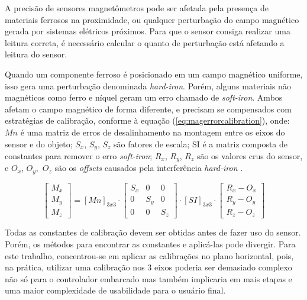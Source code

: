 A precisão de sensores magnetômetros pode ser afetada pela presença de materiais ferrosos na proximidade, ou qualquer perturbação do campo magnético gerada por sistemas elétricos próximos. Para que o sensor consiga realizar uma leitura correta, é necessário calcular o quanto de perturbação está afetando a leitura do sensor.

Quando um componente ferroso é posicionado em um campo magnético uniforme, isso gera uma perturbação denominada \textit{hard-iron}. Porém, alguns materiais não magnéticos como ferro e níquel geram um erro chamado de \textit{soft-iron}. Ambos afetam o campo magnético de forma diferente, e precisam se compensados com estratégias de calibração, conforme à equação (\ref{eq:magerrorcalibration}), onde: $ Mn $ é uma matriz de erros de desalinhamento na montagem entre os eixos do sensor e do objeto; $S_x$, $S_y$, $S_z$ são fatores de escala; SI é a matriz composta de constantes para remover o erro \textit{soft-iron}; $R_x$, $R_y$, $R_z$ são os valores crus do sensor, e $O_x$, $O_y,$ $O_z$ são os \textit{offsets} causados pela interferência \textit{hard-iron} \cite{calibrationMatrix}.

\begin{equation}
	\left[\begin{array}{c}  M_x\\M_y\\M_z \end{array}\right] = \left[Mn\right]_{3x3} \cdot \left[\begin{array}{ccc} S_x&0&0\\ 0&S_y&0\\ 0&0&S_z \end{array}\right]\cdot \left[SI\right]_{3x3} \cdot \left[\begin{array}{c} R_x - O_x\\R_y - O_y\\R_z - O_z \end{array}\right]
	\label{eq:magerrorcalibration}
\end{equation}

Todas as constantes de calibração devem ser obtidas antes de fazer uso do sensor. Porém, os métodos para encontrar as constantes e aplicá-las pode divergir. Para este trabalho, concentrou-se em aplicar as calibrações no plano horizontal, pois, na prática, utilizar uma calibração nos 3 eixos poderia ser demasiado complexo não só para o controlador embarcado mas também implicaria em mais etapas e uma maior complexidade de usabilidade para o usuário final.



